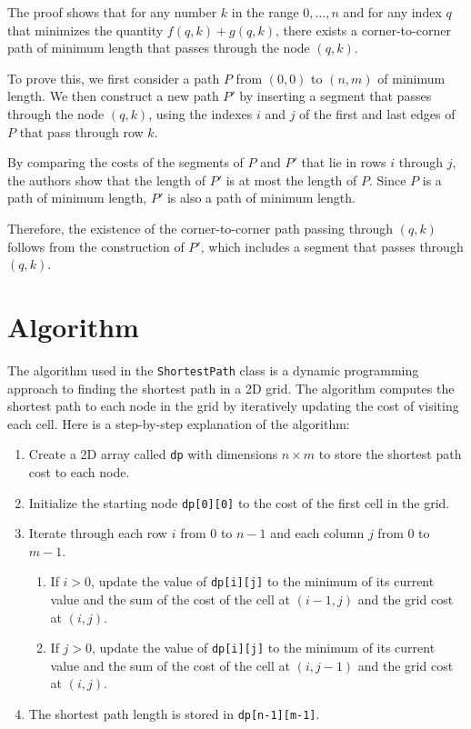 \documentclass[12pt]{article}
\begin{document}
The proof shows that for any number $k$ in the range ${0,\ldots,n}$ and for any index $q$ that minimizes the quantity $f(q,k) + g(q,k)$, there exists a corner-to-corner path of minimum length that passes through the node $(q,k)$.

To prove this, we first consider a path $P$ from $(0,0)$ to $(n,m)$ of minimum length. We then construct a new path $P'$ by inserting a segment that passes through the node $(q,k)$, using the indexes $i$ and $j$ of the first and last edges of $P$ that pass through row $k$.

By comparing the costs of the segments of $P$ and $P'$ that lie in rows $i$ through $j$, the authors show that the length of $P'$ is at most the length of $P$. Since $P$ is a path of minimum length, $P'$ is also a path of minimum length.

Therefore, the existence of the corner-to-corner path passing through $(q,k)$ follows from the construction of $P'$, which includes a segment that passes through $(q,k)$.

\section*{Algorithm}

The algorithm used in the \texttt{ShortestPath} class is a dynamic programming approach to finding the shortest path in a 2D grid. The algorithm computes the shortest path to each node in the grid by iteratively updating the cost of visiting each cell. Here is a step-by-step explanation of the algorithm:

\begin{enumerate}
\item Create a 2D array called \texttt{dp} with dimensions $n \times m$ to store the shortest path cost to each node.
\item Initialize the starting node \texttt{dp[0][0]} to the cost of the first cell in the grid.
\item Iterate through each row $i$ from 0 to $n-1$ and each column $j$ from 0 to $m-1$.
\begin{enumerate}
\item If $i > 0$, update the value of \texttt{dp[i][j]} to the minimum of its current value and the sum of the cost of the cell at $(i-1, j)$ and the grid cost at $(i, j)$.
\item If $j > 0$, update the value of \texttt{dp[i][j]} to the minimum of its current value and the sum of the cost of the cell at $(i, j-1)$ and the grid cost at $(i, j)$.
\end{enumerate}
\item The shortest path length is stored in \texttt{dp[n-1][m-1]}.
\end{enumerate}
\end{document}
